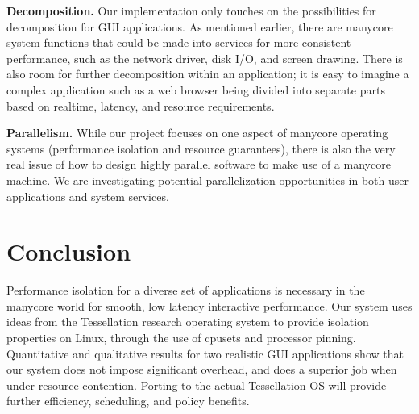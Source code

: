 \documentclass[letterpaper,twocolumn,11pt]{article}
\begin{document}
\textbf{Decomposition.} Our implementation only touches on the possibilities for decomposition for GUI applications. As mentioned earlier, there are manycore system functions that could be made into services for more consistent performance, such as the network driver, disk I/O, and screen drawing. There is also room for further decomposition within an application; it is easy to imagine a complex application such as a web browser being divided into separate parts based on realtime, latency, and resource requirements.

\textbf{Parallelism.} While our project focuses on one aspect of manycore operating systems (performance isolation and resource guarantees), there is also the very real issue of how to design highly parallel software to make use of a manycore machine. We are investigating potential parallelization opportunities in both user applications and system services.



\section{Conclusion}

Performance isolation for a diverse set of applications is necessary in the manycore world for smooth, low latency interactive performance. Our system uses ideas from the Tessellation research operating system to provide isolation properties on Linux, through the use of cpusets and processor pinning. Quantitative and qualitative results for two realistic GUI applications show that our system does not impose significant overhead, and does a superior job when under resource contention. Porting to the actual Tessellation OS will provide further efficiency, scheduling, and policy benefits.
\end{document}

